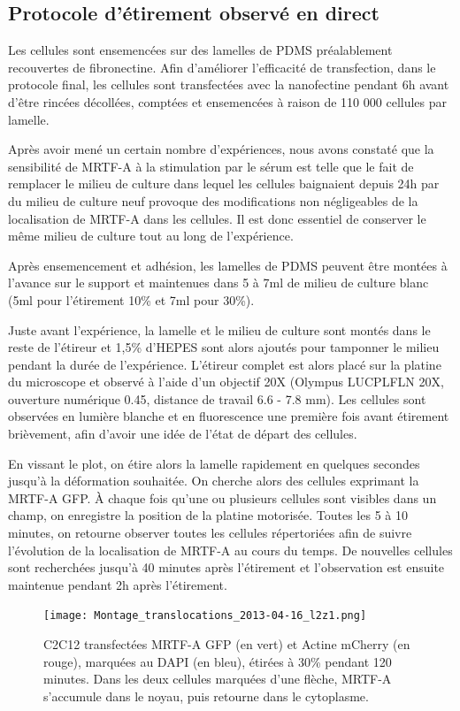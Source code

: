 	\subsection{Protocole d'étirement observé en direct}
	Les cellules sont ensemencées sur des lamelles de PDMS préalablement recouvertes de fibronectine. Afin d'améliorer l'efficacité de transfection, dans le protocole final, les cellules sont transfectées avec la nanofectine pendant 6h avant d'être rincées décollées, comptées et ensemencées à raison de 110 000 cellules par lamelle. 
	
	Après avoir mené un certain nombre d'expériences, nous avons constaté que la sensibilité de MRTF-A à la stimulation par le sérum est telle que le fait de remplacer le milieu de culture dans lequel les cellules baignaient depuis 24h par du milieu de culture neuf provoque des modifications non négligeables de la localisation de MRTF-A dans les cellules. Il est donc essentiel de conserver le même milieu de culture tout au long de l'expérience. 
	
	Après ensemencement et adhésion, les lamelles de PDMS peuvent être montées à l'avance sur le support et maintenues dans 5 à 7ml de milieu de culture blanc (5ml pour l'étirement 10\% et 7ml pour 30\%). 
	
	Juste avant l'expérience, la lamelle et le milieu de culture sont montés dans le reste de l'étireur et 1,5\% d'HEPES sont alors ajoutés pour tamponner le milieu pendant la durée de l'expérience. L'étireur complet est alors placé sur la platine du microscope et observé à l'aide d'un objectif 20X (Olympus LUCPLFLN 20X, ouverture numérique 0.45, distance de travail 6.6 - 7.8 mm). Les cellules sont observées en lumière blanche et en fluorescence une première fois avant étirement brièvement, afin d'avoir une idée de l'état de départ des cellules. 
	
	En vissant le plot, on étire alors la lamelle rapidement en quelques secondes jusqu'à la déformation souhaitée. On cherche alors des cellules exprimant la MRTF-A GFP. À chaque fois qu'une ou plusieurs cellules sont visibles dans un champ, on enregistre la position de la platine motorisée. Toutes les 5 à 10 minutes, on retourne observer toutes les cellules répertoriées afin de suivre l'évolution de la localisation de MRTF-A au cours du temps. De nouvelles cellules sont recherchées jusqu'à 40 minutes après l'étirement et l'observation est ensuite maintenue pendant 2h après l'étirement. 
	\begin{figure}
	\texttt{[image: Montage\_translocations\_2013-04-16\_l2z1.png]}
	\caption{C2C12 transfectées MRTF-A GFP (en vert) et Actine mCherry (en rouge), marquées au DAPI (en bleu), étirées à 30\% pendant 120 minutes. Dans les deux cellules marquées d'une flèche, MRTF-A s'accumule dans le noyau, puis retourne dans le cytoplasme.}
	\label{Etirement_live}
	\end{figure}
	
